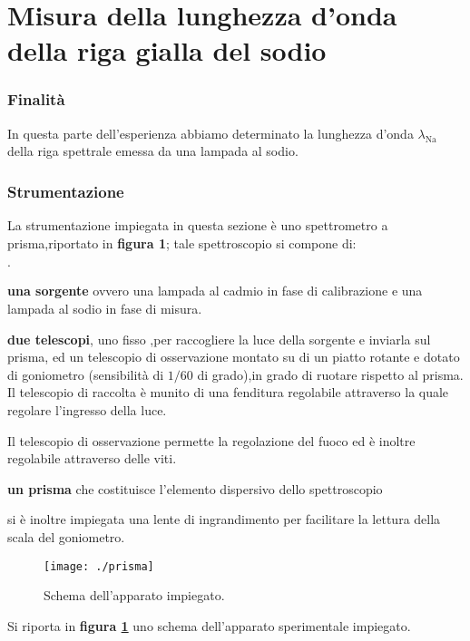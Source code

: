 \newpage
\part{Misura della lunghezza d'onda della riga gialla del sodio}
\section{Finalità}
	In questa parte dell'esperienza abbiamo determinato la lunghezza d’onda $\lambda_{\text{Na}}$ della riga spettrale
	emessa da una lampada al sodio.
\section{Strumentazione}\label{sez:str_a}
	La strumentazione impiegata in questa sezione è uno spettrometro a
	prisma,riportato in \textbf{figura 1};
	tale spettroscopio si compone di:
	\begin{list}{$\cdot$}{}
		\item \textbf{una sorgente } ovvero una lampada al cadmio in fase
		di
		calibrazione e una lampada al sodio in fase di misura.
		\item \textbf{due telescopi}, uno fisso	,per raccogliere la luce
		della
		sorgente e inviarla sul prisma, ed un telescopio di osservazione
		montato su di un piatto rotante e dotato di goniometro
		(sensibilità di $1/60$ di grado),in grado di ruotare
		rispetto al prisma.
		Il telescopio di raccolta  è munito di una fenditura regolabile
		attraverso la quale regolare l'ingresso della luce.

		Il telescopio di osservazione permette la regolazione del fuoco
		ed è
		inoltre regolabile attraverso delle viti.
		\item \textbf{un prisma} che costituisce l'elemento dispersivo
		dello
		spettroscopio
	\end{list}
	\bigskip
	si è inoltre impiegata una lente di ingrandimento per facilitare la
	lettura della scala del goniometro.

	\bigskip


	\begin{figure} [h]
		\centering
		\texttt{[image: ./prisma]}
		\caption{Schema dell'apparato impiegato.}
		\label{fig:prisma}
	\end{figure}
	Si riporta in \textbf{figura \ref{fig:prisma}} uno schema
	dell'apparato
	sperimentale impiegato.
